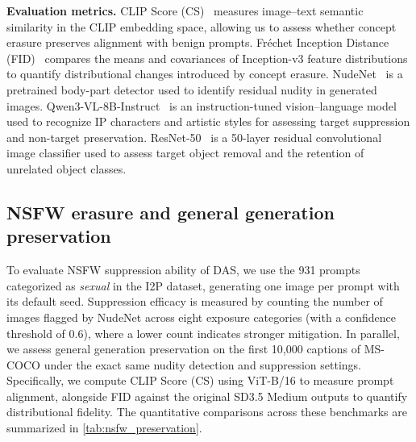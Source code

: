 \noindent\textbf{Evaluation metrics.}
CLIP Score (CS)~\cite{hessel-etal-2021-clipscore,pmlr-v139-radford21a} measures image--text semantic similarity in the CLIP embedding space, allowing us to assess whether concept erasure preserves alignment with benign prompts.
Fr\'echet Inception Distance (FID)~\cite{NIPS2017_8a1d6947} compares the means and covariances of Inception-v3 feature distributions to quantify distributional changes introduced by concept erasure.
NudeNet~\cite{nudenet} is a pretrained body-part detector used to identify residual nudity in generated images.
Qwen3-VL-8B-Instruct~\cite{bai2025qwen3vltechnicalreport} is an instruction-tuned vision--language model used to recognize IP characters and artistic styles for assessing target suppression and non-target preservation.
ResNet-50~\cite{He_2016_CVPR} is a 50-layer residual convolutional image classifier used to assess target object removal and the retention of unrelated object classes.

\subsection{NSFW erasure and general generation preservation}
\label{sec:exp_nsfw}

To evaluate NSFW suppression ability of DAS, we use the 931 prompts categorized as \textit{sexual} in the I2P dataset, generating one image per prompt with its default seed. 
Suppression efficacy is measured by counting the number of images flagged by NudeNet across eight exposure categories (with a confidence threshold of $0.6$), where a lower count indicates stronger mitigation. 
In parallel, we assess general generation preservation on the first 10,000 captions of MS-COCO under the exact same nudity detection and suppression settings. 
Specifically, we compute CLIP Score (CS) using ViT-B/16 to measure prompt alignment, alongside FID against the original SD3.5 Medium outputs to quantify distributional fidelity. 
The quantitative comparisons across these benchmarks are summarized in \cref{tab:nsfw_preservation}.


